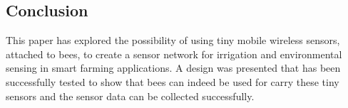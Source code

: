\documentclass[letterpaper,twocolumn,10pt]{article}
\begin{document}
\subsection*{Conclusion}

This paper has explored the possibility of using tiny mobile wireless sensors, attached to bees, to create a sensor network for irrigation and environmental sensing in smart farming applications. A design was presented that has been successfully tested to show that bees can indeed be used for carry these tiny sensors and the sensor data can be collected successfully. 
\end{document}
